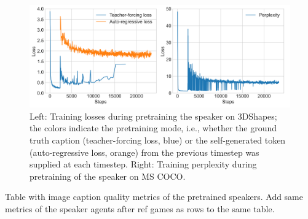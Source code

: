 \begin{figure}
	\centering
	\includegraphics[width=\linewidth]{images/3dshapes_pretraining_losses_ppls.png}
	\caption{Left: Training losses during pretraining the speaker on 3DShapes; the colors indicate the pretraining mode, i.e., whether the ground truth caption (teacher-forcing loss, blue) or the self-generated token (auto-regressive loss, orange) from the previous timestep was supplied at each timestep. Right: Training perplexity during pretraining of the speaker on MS COCO.}
	\label{fig:3dshapes_pretraining}
\end{figure}  

Table with image caption quality metrics of the pretrained speakers. Add same metrics of the speaker agents after ref games as rows to the same table. 


